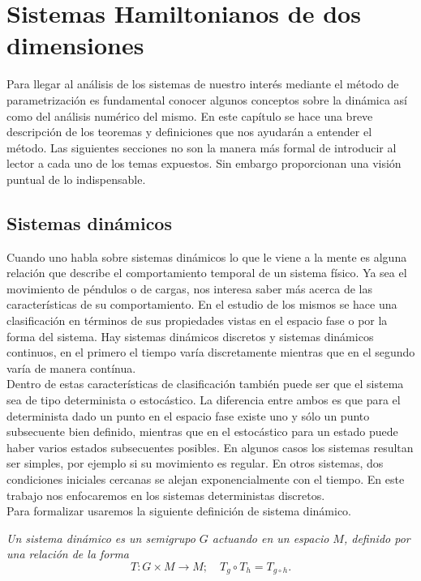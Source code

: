 \chapter{Sistemas Hamiltonianos de dos dimensiones}
Para llegar al análisis de los sistemas de nuestro interés mediante el método de parametrización es fundamental conocer algunos conceptos sobre la dinámica así como del análisis numérico del mismo. En este capítulo se hace una breve descripción de los teoremas y definiciones que nos ayudarán a entender el método. Las siguientes secciones no son la manera más formal de introducir al lector a cada uno de los temas expuestos. Sin embargo proporcionan una visión puntual de lo indispensable. 

\section{Sistemas dinámicos}
Cuando uno habla sobre sistemas dinámicos lo que le viene a la mente es alguna relación que describe el comportamiento temporal de un sistema físico. Ya sea el movimiento de péndulos o de cargas, nos interesa saber más acerca de las características de su comportamiento. 
En el estudio de los mismos se hace una clasificación en términos de sus propiedades vistas en el espacio fase o por la forma del sistema. Hay sistemas dinámicos discretos y sistemas dinámicos continuos, en el primero el tiempo varía discretamente mientras que en el segundo varía de manera contínua. \\

 Dentro de estas características de clasificación también puede ser que el sistema sea de tipo determinista o estocástico. La diferencia entre ambos es que para el determinista dado un punto en el espacio fase existe uno y sólo un punto subsecuente bien definido, mientras que en el estocástico para un estado puede haber varios estados subsecuentes posibles.
En algunos casos los sistemas resultan ser simples, por ejemplo si su movimiento es regular. En otros sistemas, dos condiciones iniciales cercanas se alejan exponencialmente con el tiempo. En este trabajo nos enfocaremos en los  sistemas deterministas discretos.\\

Para formalizar usaremos la siguiente definición de sistema dinámico.  \\
\begin{defini}
\textit{Un sistema dinámico es un semigrupo $G$ actuando en un espacio $M$, definido por una relación de la forma}
\begin{equation}
T : G \times M \rightarrow M; \quad
T_{g}\circ T_{h}=T_{g\circ h} . \label{def sistema dinamico}
\end{equation}
\end{defini}

